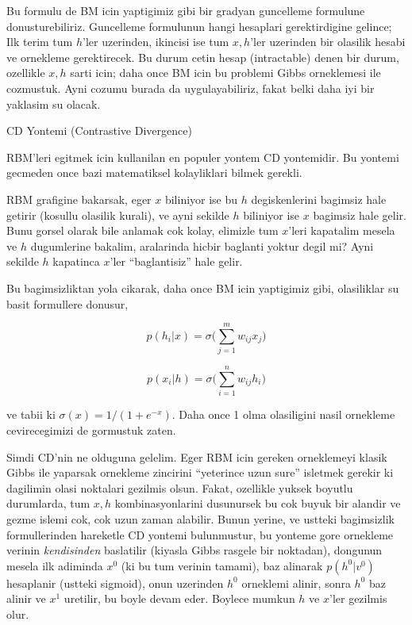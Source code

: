 \documentclass[12pt,fleqn]{article}\usepackage{../common}
\begin{document}
Bu formulu de BM icin yaptigimiz gibi bir gradyan guncelleme formulune
donusturebiliriz. Guncelleme formulunun hangi hesaplari gerektirdigine
gelince; Ilk terim tum $h$'ler uzerinden, ikincisi ise tum $x,h$'ler
uzerinden bir olasilik hesabi ve ornekleme gerektirecek. Bu durum cetin
hesap (intractable) denen bir durum, ozellikle $x,h$ sarti icin; daha once
BM icin bu problemi Gibbs orneklemesi ile cozmustuk. Ayni cozumu burada da
uygulayabiliriz, fakat belki daha iyi bir yaklasim su olacak.

CD Yontemi (Contrastive Divergence) 

RBM'leri egitmek icin kullanilan en populer yontem CD yontemidir. Bu
yontemi gecmeden once bazi matematiksel kolayliklari bilmek gerekli. 

RBM grafigine bakarsak, eger $x$ biliniyor ise bu $h$ degiskenlerini
bagimsiz hale getirir (kosullu olasilik kurali), ve ayni sekilde $h$
biliniyor ise $x$ bagimsiz hale gelir. Bunu gorsel olarak bile anlamak cok
kolay, elimizle tum $x$'leri kapatalim mesela ve $h$ dugumlerine bakalim,
aralarinda hicbir baglanti yoktur degil mi? Ayni sekilde $h$ kapatinca
$x$'ler ``baglantisiz'' hale gelir. 

Bu bagimsizliktan yola cikarak, daha once BM icin yaptigimiz gibi,
olasiliklar su basit formullere donusur,

$$ p(h_i|x) = \sigma \bigg( \sum _{j=1}^{m} w_{ij} x_j \bigg) $$

$$ p(x_i|h) = \sigma \bigg( \sum _{i=1}^{n} w_{ij} h_i \bigg) $$

ve tabii ki $\sigma(x) = 1 / (1+e^{-x})$. Daha once 1 olma olasiligini
nasil ornekleme cevirecegimizi de gormustuk zaten. 

Simdi CD'nin ne olduguna gelelim. Eger RBM icin gereken orneklemeyi klasik
Gibbs ile yaparsak ornekleme zincirini ``yeterince uzun sure'' isletmek
gerekir ki dagilimin olasi noktalari gezilmis olsun. Fakat, ozellikle
yuksek boyutlu durumlarda, tum $x,h$ kombinasyonlarini dusunursek bu cok
buyuk bir alandir ve gezme islemi cok, cok uzun zaman alabilir. Bunun
yerine, ve ustteki bagimsizlik formullerinden hareketle CD yontemi
bulunmustur, bu yonteme gore ornekleme verinin {\em kendisinden} baslatilir
(kiyasla Gibbs rasgele bir noktadan), dongunun mesela ilk adiminda $x^0$
(ki bu tum verinin tamami), baz alinarak $p(h^0|v^0)$ hesaplanir (ustteki
sigmoid), onun uzerinden $h^0$ orneklemi alinir, sonra $h^0$ baz alinir ve
$x^1$ uretilir, bu boyle devam eder. Boylece mumkun $h$ ve $x$'ler gezilmis
olur.
\end{document}
